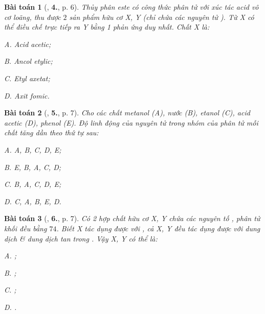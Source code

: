 \documentclass{article}
\numberwithin{equation}{section}
\newtheorem{baitoan}{Bài toán}[section]
\begin{document}
\begin{baitoan}[\cite{An2008}, \textbf{4.}, p. 6]
	Thủy phân este có công thức phân tử \emph{} với xúc tác acid vô cơ loãng, thu được $2$ sản phẩm hữu cơ X, Y (chỉ chứa các nguyên tử \emph{}). Từ X có thể điều chế trực tiếp ra Y bằng 1 phản ứng duy nhất. Chất X là:
	\begin{enumerate*}
		\item[{\rm\sf A.}] Acid acetic;
		\item[{\rm\sf B.}] Ancol etylic;
		\item[{\rm\sf C.}] Etyl axetat;
		\item[{\rm\sf D.}] Axit fomic.
	\end{enumerate*}
\end{baitoan}

\begin{baitoan}[\cite{An2008}, \textbf{5.}, p. 7]
	Cho các chất metanol (A), nước (B), etanol (C), acid acetic (D), phenol (E). Độ linh động của nguyên tử \emph{} trong nhóm \emph{} của phân tử mỗi chất tăng dần theo thứ tự sau:
	\begin{enumerate*}
		\item[{\rm\sf A.}] A, B, C, D, E;
		\item[{\rm\sf B.}] E, B, A, C, D;
		\item[{\rm\sf C.}] B, A, C, D, E;
		\item[{\rm\sf D.}] C, A, B, E, D.
	\end{enumerate*}
\end{baitoan}

\begin{baitoan}[\cite{An2008}, \textbf{6.}, p. 7]
	Có 2 hợp chất hữu cơ X, Y chứa các nguyên tố \emph{}, phân tử khối đều bằng $74$. Biết X tác dụng được với \emph{}, cả X, Y đều tác dụng được với dung dịch \emph{} \& dung dịch \emph{} tan trong \emph{}. Vậy X, Y có thể là:
	\begin{enumerate*}
		\item[{\rm\sf A.}] \emph{};
		\item[{\rm\sf B.}] \emph{};
		\item[{\rm\sf C.}] \emph{};
		\item[{\rm\sf D.}] \emph{}.
	\end{enumerate*}
\end{baitoan}
\end{document}
